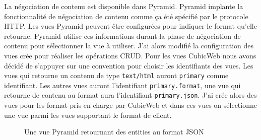 La négociation de contenu est disponible dans Pyramid. Pyramid implante la fonctionnalité de négociation de contenu comme ça été spécifié par le protocole HTTP. Les vues Pyramid peuvent être configurées pour indiquer le format qu'elle retourne. Pyramid utilise ces informations durant la phase de négociation de contenu pour sélectionner la vue à utiliser. J'ai alors modifié la configuration des vues crée pour réaliser les opérations CRUD. Pour les vues CubicWeb nous avons décidé de s'appuyer sur une convention pour choisir les identifiants des vues. Les vues qui retourne un contenu de type \texttt{text/html} auront \texttt{primary} comme identifiant. Les autres vues auront l'identifiant \texttt{primary.format}, une vue qui retourne de contenu au format  aura l'identifiant \texttt{primary.json}. J'ai crée alors des vues pour les format pris en charge par CubicWeb et dans ces vues on sélectionne une vue parmi les vues supportant le format de client.   


\begin{figure}[htp]
    \centering
    \caption{Une vue Pyramid retournant des entities au format JSON}
    \label{fig:getjson}
\end{figure}
